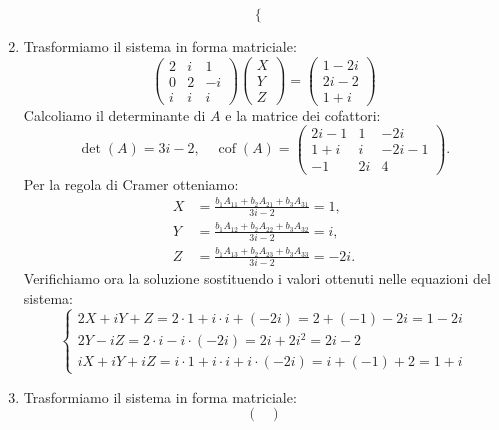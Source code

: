 \documentclass{article}
\theoremstyle{plain}
\theoremstyle{definition}
\theoremstyle{remark}
\begin{document}
\begin{enumerate}
\[\begin{cases}
        \end{cases}\]
    \item Trasformiamo il sistema in forma matriciale:
        \[
        \begin{pmatrix}
              2 & i & 1\\[2mm]
              0 & 2 & -i\\[2mm]
              i & i & i
          \end{pmatrix}
          \begin{pmatrix}
              X\\[2mm]
              Y\\[2mm]
              Z
          \end{pmatrix}=
          \begin{pmatrix}
              1-2i\\[2mm]
              2i-2\\[2mm]
              1+i
          \end{pmatrix}
        \]
        Calcoliamo il determinante di $A$ e la matrice dei cofattori:
        \[
            \det(A)=3i-2,\quad \operatorname{cof}(A)=
            \begin{pmatrix}
            2i-1 & 1    & -2i\\[2mm]
            1+i  & i    & -2i-1\\[2mm]
            -1   & 2i   & 4
            \end{pmatrix}.
        \]
        Per la regola di Cramer otteniamo:
        \begin{align*}
            X &= \frac{b_1A_{11}+b_2A_{21}+b_3A_{31}}{3i-2} = 1,\\[2mm]
            Y &= \frac{b_1A_{12}+b_2A_{22}+b_3A_{32}}{3i-2} = i,\\[2mm]
            Z &= \frac{b_1A_{13}+b_2A_{23}+b_3A_{33}}{3i-2} = -2i.
        \end{align*}
        Verifichiamo ora la soluzione sostituendo i valori ottenuti nelle equazioni del sistema:
        \[\begin{cases}
            2X+iY+Z=2\cdot 1 + i\cdot i + (-2i)= 2 + (-1) - 2i = 1-2i\\
            2Y-iZ= 2\cdot i - i\cdot(-2i)= 2i + 2i^2 = 2i - 2\\
            iX+iY+iZ= i\cdot 1 + i\cdot i + i\cdot(-2i)= i + (-1) + 2 = 1+i
        \end{cases}\]
    \item Trasformiamo il sistema in forma matriciale:
        \[            
            \begin{pmatrix}

\end{pmatrix}\]
\end{enumerate}
\end{document}
